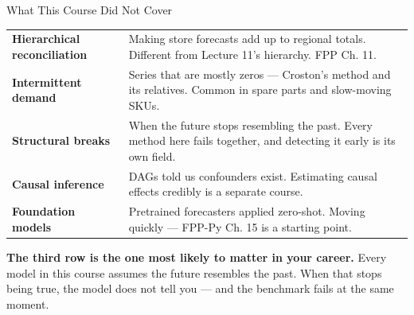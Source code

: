 \documentclass[aspectratio=169, 11pt]{beamer}
\begin{document}
\begin{frame}{What This Course Did Not Cover}
  \begin{center}
    {\small
    \begin{tabular}{p{4.0cm}p{8.3cm}}
      \toprule
      \textbf{Hierarchical reconciliation} & Making store forecasts add up to regional totals.
      Different from Lecture 11's hierarchy. FPP Ch. 11. \\[2pt]
      \textbf{Intermittent demand} & Series that are mostly zeros --- Croston's method and its
      relatives. Common in spare parts and slow-moving SKUs. \\[2pt]
      \textbf{Structural breaks} & When the future stops resembling the past. Every method here
      fails together, and detecting it early is its own field. \\[2pt]
      \textbf{Causal inference} & DAGs told us confounders exist. Estimating causal effects
      credibly is a separate course. \\[2pt]
      \textbf{Foundation models} & Pretrained forecasters applied zero-shot. Moving quickly ---
      FPP-Py Ch. 15 is a starting point. \\
      \bottomrule
    \end{tabular}
    }
  \end{center}

  \vspace{0.05cm}
  \textbf{The third row is the one most likely to matter in your career.} Every model in this
  course assumes the future resembles the past. When that stops being true, the model does not
  tell you --- and the benchmark fails at the same moment.
\end{frame}
\end{document}
